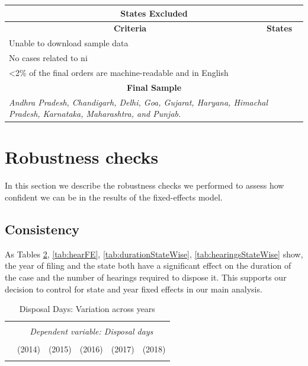 \documentclass[12pt,a4paper]{article}
\begin{document}
\begin{appendices}
 \begin{longtable}{p{}p{}}
 \label{tab:sample_selection}
 \\
 \toprule
 \multicolumn{2}{c}{\textbf{States Excluded}} \\ \midrule
 \multicolumn{1}{c|}{\textbf{Criteria}} & \multicolumn{1}{c}{\textbf{States}} \\ \midrule
 \multicolumn{1}{p{0.32\textwidth}|}{Unable to download sample data} & \\ \midrule
 \multicolumn{1}{p{0.32\textwidth}|}{No cases related to \gls{ni}} & \\ \midrule
 \multicolumn{1}{p{0.32\textwidth}|}{\textless 2\% of the final orders are machine-readable and in English} & \\ \midrule
 \multicolumn{2}{c}{\textbf{Final Sample}} \\ \midrule
 \multicolumn{2}{p{0.92\textwidth}}{\textit{Andhra Pradesh, Chandigarh, Delhi, Goa, Gujarat, Haryana, Himachal Pradesh, Karnataka, Maharashtra, and Punjab.}} \\ \bottomrule
 \end{longtable}
 
 \pagebreak
 
 \section{Robustness checks}\label{sec:robustness}
 In this section we describe the robustness checks we performed to assess how confident we can be in the results of the fixed-effects model.
 
 \subsection{Consistency}
 \label{sec:consistency}
 As Tables \ref{tab:yearFE}, \ref{tab:hearFE}, \ref{tab:durationStateWise}, \ref{tab:hearingsStateWise} show, the year of filing and the state both have a significant effect on the duration of the case and the number of hearings required to dispose it. This supports our decision to control for state and year fixed effects in our main analysis.
 
 {\footnotesize \begin{longtable}{lcc|ccc} 
 \caption{Disposal Days: Variation across years}\label{tab:yearFE}
 \\[-1.8ex]
 \hline \\[-1.8ex] 
 & \multicolumn{5}{c}{\textit{Dependent variable: Disposal days}} \\ 
 \cline{2-6} 
 \\[-1.8ex] & (2014) & (2015) & (2016) & (2017) & (2018)\\ 
 \hline \\[-1.8ex]
 

\end{longtable}}
\end{appendices}
\end{document}
